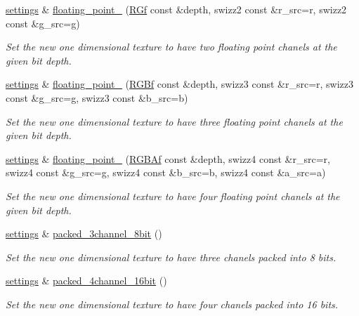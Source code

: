\begin{DoxyCompactItemize}
\hyperlink{classgfx_1_1texture__1D_1_1settings}{settings} \& \hyperlink{classgfx_1_1texture__1D_1_1settings_a5cd5ba0a9adbffdf593478bb3f1aa78a}{floating\-\_\-point\-\_} (\hyperlink{classgfx_1_1RGf}{R\-Gf} const \&depth, swizz2 const \&r\-\_\-src=r, swizz2 const \&g\-\_\-src=g)
\begin{DoxyCompactList}\small\item\em Set the new one dimensional texture to have two floating point chanels at the given bit depth. \end{DoxyCompactList}\item 
\hyperlink{classgfx_1_1texture__1D_1_1settings}{settings} \& \hyperlink{classgfx_1_1texture__1D_1_1settings_afda76e6313e3a4cba80953254c00ffb7}{floating\-\_\-point\-\_} (\hyperlink{classgfx_1_1RGBf}{R\-G\-Bf} const \&depth, swizz3 const \&r\-\_\-src=r, swizz3 const \&g\-\_\-src=g, swizz3 const \&b\-\_\-src=b)
\begin{DoxyCompactList}\small\item\em Set the new one dimensional texture to have three floating point chanels at the given bit depth. \end{DoxyCompactList}\item 
\hyperlink{classgfx_1_1texture__1D_1_1settings}{settings} \& \hyperlink{classgfx_1_1texture__1D_1_1settings_a44affa1cb1e7ee6993d9121477ba04db}{floating\-\_\-point\-\_} (\hyperlink{classgfx_1_1RGBAf}{R\-G\-B\-Af} const \&depth, swizz4 const \&r\-\_\-src=r, swizz4 const \&g\-\_\-src=g, swizz4 const \&b\-\_\-src=b, swizz4 const \&a\-\_\-src=a)
\begin{DoxyCompactList}\small\item\em Set the new one dimensional texture to have four floating point chanels at the given bit depth. \end{DoxyCompactList}\item 
\hyperlink{classgfx_1_1texture__1D_1_1settings}{settings} \& \hyperlink{classgfx_1_1texture__1D_1_1settings_aca453b50186534d6997a42db58bcad3f}{packed\-\_\-3channel\-\_\-8bit} ()
\begin{DoxyCompactList}\small\item\em Set the new one dimensional texture to have three chanels packed into 8 bits. \end{DoxyCompactList}\item 
\hyperlink{classgfx_1_1texture__1D_1_1settings}{settings} \& \hyperlink{classgfx_1_1texture__1D_1_1settings_aa326d241903be5350b8af060ee613e60}{packed\-\_\-4channel\-\_\-16bit} ()
\begin{DoxyCompactList}\small\item\em Set the new one dimensional texture to have four chanels packed into 16 bits. \end{DoxyCompactList}\item 

\end{DoxyCompactItemize}
